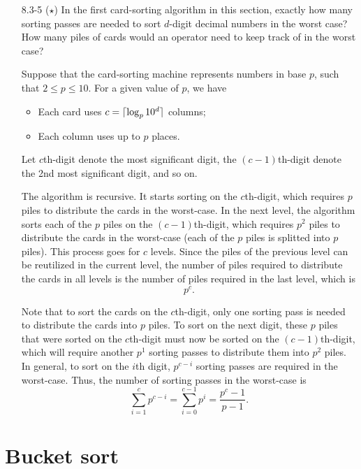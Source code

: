 \begin{enumerate}
\newpage

\item[8.3-5]{($\star$) In the first card-sorting algorithm in this section,
exactly how many sorting passes are needed to sort $d$-digit decimal numbers in
the worst case? How many piles of cards would an operator need to keep track of
in the worst case?}

\begin{framed}
Suppose that the card-sorting machine represents numbers in base $p$, such
that $2 \le p \le 10$. For a given value of $p$, we have
\begin{itemize}
  \item Each card uses $c = \lceil\log_p 10^d\rceil$ columns;
  \item Each column uses up to $p$ places.
\end{itemize}

Let $c$th-digit denote the most significant digit, the $(c - 1)$th-digit
denote the 2nd most significant digit, and so on.

The algorithm is recursive. It starts sorting on the $c$th-digit, which
requires $p$ piles to distribute the cards in the worst-case. In the next level,
the algorithm sorts each of the $p$ piles on the $(c - 1)$th-digit, which
requires $p^2$ piles to distribute the cards in the worst-case (each of the
$p$ piles is splitted into $p$ piles). This process goes for $c$ levels. Since
the piles of the previous level can be reutilized in the current level, the
number of piles required to distribute the cards in all levels is the number of
piles required in the last level, which is
\[
  p^c.
\]

Note that to sort the cards on the $c$th-digit, only one sorting pass is needed
to distribute the cards into $p$ piles. To sort on the next digit, these $p$
piles that were sorted on the $c$th-digit must now be sorted on the
$(c - 1)$th-digit, which will require another $p^1$ sorting passes to distribute
them into $p^2$ piles. In general, to sort on the $i$th digit, $p^{c - i}$
sorting passes are required in the worst-case. Thus, the number of sorting
passes in the worst-case is
\[
  \sum_{i = 1}^{c} p^{c - i} = \sum_{i = 0}^{c - 1} p^{i} = \frac{p^c - 1}{p - 1}.
\]

\end{framed}

\end{enumerate}

\newpage

\section{Bucket sort}

